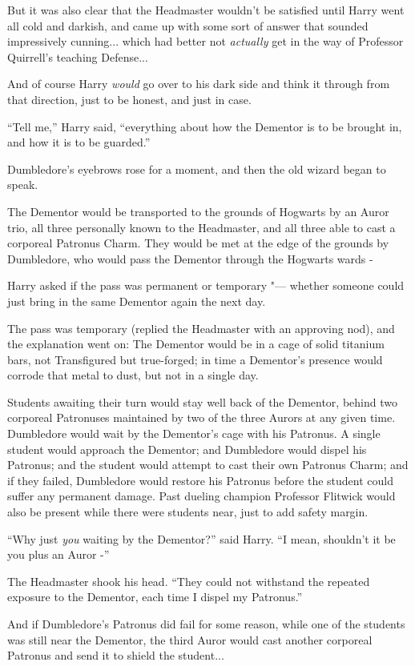 But it was also clear that the Headmaster wouldn't be satisfied until
Harry went all cold and darkish, and came up with some sort of answer
that sounded impressively cunning... which had better not
\emph{actually} get in the way of Professor Quirrell's teaching
Defense...

And of course Harry \emph{would} go over to his dark side and think it
through from that direction, just to be honest, and just in case.

``Tell me,'' Harry said, ``everything about how the Dementor is to be
brought in, and how it is to be guarded.''

Dumbledore's eyebrows rose for a moment, and then the old wizard began
to speak.

The Dementor would be transported to the grounds of Hogwarts by an Auror
trio, all three personally known to the Headmaster, and all three able
to cast a corporeal Patronus Charm. They would be met at the edge of the
grounds by Dumbledore, who would pass the Dementor through the Hogwarts
wards -

Harry asked if the pass was permanent or temporary "--- whether someone
could just bring in the same Dementor again the next day.

The pass was temporary (replied the Headmaster with an approving nod),
and the explanation went on: The Dementor would be in a cage of solid
titanium bars, not Transfigured but true-forged; in time a Dementor's
presence would corrode that metal to dust, but not in a single day.

Students awaiting their turn would stay well back of the Dementor,
behind two corporeal Patronuses maintained by two of the three Aurors at
any given time. Dumbledore would wait by the Dementor's cage with his
Patronus. A single student would approach the Dementor; and Dumbledore
would dispel his Patronus; and the student would attempt to cast their
own Patronus Charm; and if they failed, Dumbledore would restore his
Patronus before the student could suffer any permanent damage. Past
dueling champion Professor Flitwick would also be present while there
were students near, just to add safety margin.

``Why just \emph{you} waiting by the Dementor?'' said Harry. ``I mean,
shouldn't it be you plus an Auror -''

The Headmaster shook his head. ``They could not withstand the repeated
exposure to the Dementor, each time I dispel my Patronus.''

And if Dumbledore's Patronus did fail for some reason, while one of the
students was still near the Dementor, the third Auror would cast another
corporeal Patronus and send it to shield the student...

